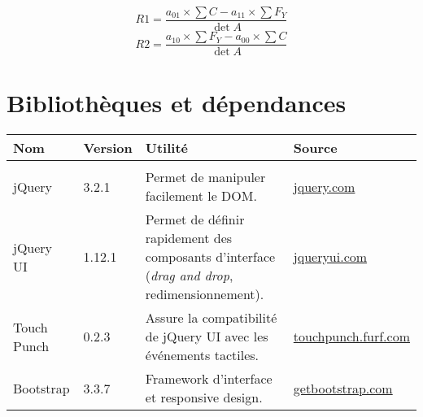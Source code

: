 \documentclass[draft]{report}
\begin{document}
\[ R1 = \dfrac{ a_{01} \times \sum C - a_{11} \times \sum F_Y }{\det A} \]
\[ R2 = \dfrac{ a_{10} \times \sum F_Y - a_{00} \times \sum C }{\det A} \]



\chapter{Bibliothèques et dépendances}

\noindent
\begin{tabularx}{\textwidth}{llXl}
\hline
Nom & Version & Utilité & Source \\
\hline\\
jQuery & 3.2.1 & Permet de manipuler facilement le DOM. & \url{jquery.com} \\
jQuery UI & 1.12.1 & Permet de définir rapidement des composants d'interface (\textit{drag and drop}, redimensionnement). & \url{jqueryui.com} \\
Touch Punch & 0.2.3 & Assure la compatibilité de jQuery UI avec les événements tactiles. & \url{touchpunch.furf.com} \\
Bootstrap & 3.3.7 & Framework d'interface et responsive design. & \url{getbootstrap.com} \\
\end{tabularx}
\end{document}
